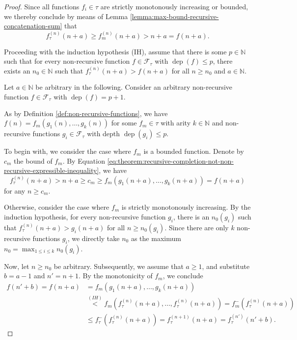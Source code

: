 \begin{proof}
	
	Since all functions $f_i\in\tau$ are strictly monotonously increasing or bounded, we thereby conclude by means of Lemma \ref{lemma:max-bound-recursive-concatenation-sum} that
	\begin{equation}
		\label{eq:theorem:recursive-completion-not-non-recursive-expressible-inequality}
		f_{\tau}^{(n)}(n+a)\geq f_m^{(n)}(n+a) > n+a = f(n+a).
	\end{equation}
	
	Proceeding with the induction hypothesis (IH), assume that there is some $p\in\mathbb{N}$ such that for every non-recursive function $f\in\mathcal{F}_{\tau}$ with $\operatorname{dep}(f)\leq p$, there exists an $n_0\in\mathbb{N}$ such that $f_\tau^{(n)}(n+a)>f(n+a)$ for all $n\geq n_0$ and $a\in\mathbb{N}$.
	
	Let $a\in\mathbb{N}$ be arbitrary in the following.
	Consider an arbitrary non-recursive function $f\in\mathcal{F}_{\tau}$ with $\operatorname{dep}(f)=p+1$.
	
	As by Definition \ref{def:non-recursive-functions}, we have $f(n)=f_m(g_1(n),\dots,g_k(n))$ for some $f_m\in\tau$ with arity $k\in\mathbb{N}$ and non-recursive functions $g_i\in \mathcal{F}_{\tau}$ with depth $\operatorname{dep}(g_i)\leq p$.
	
	To begin with, we consider the case where $f_m$ is a bounded function. Denote by $c_m$ the bound of $f_m$.
	By Equation \ref{eq:theorem:recursive-completion-not-non-recursive-expressible-inequality}, we have  
	\begin{equation}
		\label{eq:theorem:recursive-completion-not-non-recursive-expressible-induction-step-bounded}
		f_\tau^{(n)}(n+a)>n+a\geq c_m\geq f_m(g_1(n+a),\dots,g_k(n+a))=f(n+a)
	\end{equation}
	for any $n\geq c_m$.
	
	Otherwise, consider the case where $f_m$ is strictly monotonously increasing.
	By the induction hypothesis, for every non-recursive function $g_i$, there is an $n_0(g_i)$ such that $f_\tau^{(n)}(n+a)>g_i(n+a)$ for all $n\geq n_0(g_i)$.
	Since there are only $k$ non-recursive functions $g_i$, we directly take $n_0$ as the maximum $n_0 = \max_{1\leq i\leq k}n_0(g_i)$.
	
	Now, let $n\geq n_0$ be arbitrary. 
	Subsequently, we assume that $a\geq 1$, and substitute $b=a-1$ and $n'=n+1$.
	By the monotonicity of $f_m$, we conclude
	\begin{align}
		\label{eq:theorem:recursive-completion-not-non-recursive-expressible-induction-step}
		f(n'+b)=f(n+a)&=f_m(g_1(n+a),\dots,g_k(n+a))\\
		&\overset{(IH)}{<}f_m(f_\tau^{(n)}(n+a),\dots,f_\tau^{(n)}(n+a))=f_m^{-}(f_\tau^{(n)}(n+a))\\
		&\leq f_\tau^{-}(f_\tau^{(n)}(n+a))=f_{\tau}^{(n+1)}(n+a)=f_{\tau}^{(n')}(n'+b).
	\end{align}
	

\end{proof}

